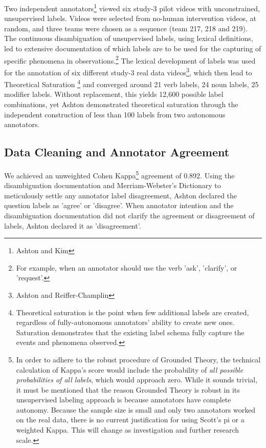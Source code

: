Two independent annotators\footnote{Ashton and Kim} viewed six study-3 pilot videos with unconstrained, unsupervised labels. Videos were selected from no-human intervention videos, at random, and three teams were chosen as a sequence (team 217, 218 and 219). The continuous disambiguation of unsupervised labels, using lexical definitions, led to extensive documentation of which labels are to be used for the capturing of specific phenomena in observations.\footnote{For example, when an annotator should use the verb 'ask', 'clarify', or 'request'.} The lexical development of labels was used for the annotation of six different study-3 real data videos\footnote{Ashton and Reiffer-Champlin}, which then lead to Theoretical Saturation \footnote{Theoretical saturation is the point when few additional labels are created, regardless of fully-autonomous annotators' ability to create new ones. Saturation demonstrates that the existing label schema fully capture the events and phenomena observed.} and converged around 21 verb labels, 24 noun labels, 25 modifier labels. Without replacement, this yields 12,600 possible label combinations, yet Ashton demonstrated theoretical saturation through the independent construction of less than 100 labels from two autonomous annotators.


\subsection{Data Cleaning and Annotator Agreement}
We achieved an unweighted Cohen Kappa\footnote{In order to adhere to the robust procedure of Grounded Theory, the technical calculation of Kappa's score would include the probability of \textit{all possible probabilities of all labels}, which would approach zero. While it sounds trivial, it must be mentioned that the reason Grounded Theory is robust in its unsupervised labeling approach is because annotators have complete autonomy. Because the sample size is small and only two annotators worked on the real data, there is no current justification for using Scott's pi or a weighted Kappa. This will change as investigation and further research scale.} agreement of 0.892. Using the disambiguation documentation and Merriam-Webster's Dictionary to meticulously settle any annotator label disagreement, Ashton declared the question labels as 'agree' or 'disagree'. When annotator intention and the disambiguation documentation did not clarify the agreement or disagreement of labels, Ashton declared it as 'disagreement'. 



